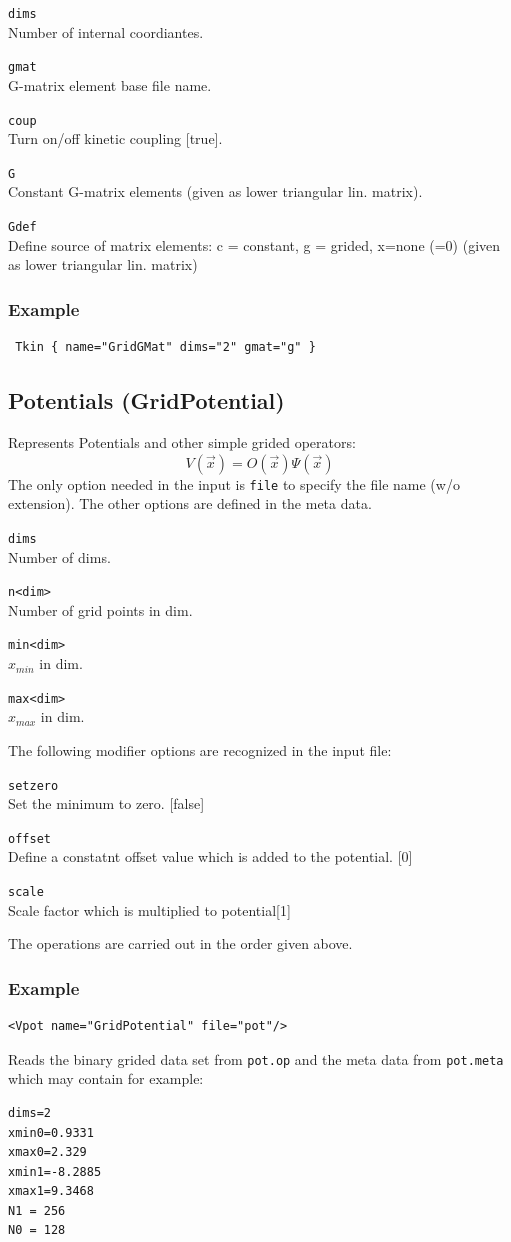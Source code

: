 \documentclass[a4paper,12pt]{scrbook}
\newcommand{\option}[2]{\item \texttt{#1}\\ #2}
\begin{document}
\begin{options}
\option{dims}{Number of internal coordiantes.}
\option{gmat}{G-matrix element base file name.}
\option{coup}{Turn on/off kinetic coupling [true].}
\option{G}{Constant G-matrix elements (given as lower triangular lin. matrix).}
\option{Gdef}{Define source of matrix elements: c = constant, g = grided, x=none (=0) (given as lower triangular lin. matrix)}
\end{options}

\subsubsection*{Example}
\begin{verbatim}
 Tkin { name="GridGMat" dims="2" gmat="g" }
\end{verbatim}

\subsection{Potentials (GridPotential)}
Represents Potentials and other simple grided operators:
\begin{equation}
 V(\vec{x}) = \hat O(\vec{x}) \Psi(\vec{x})
\end{equation}
The only option needed in the input is \verb|file| to specify the file name (w/o extension).
The other options are defined in the meta data.
\begin{options}
 \option{dims}{Number of dims.}
 \option{n<dim>}{Number of grid points in dim.}
 \option{min<dim>}{$x_{min}$ in dim.}
 \option{max<dim>}{$x_{max}$ in dim.}
\end{options}

The following modifier options are recognized in the input file:
\begin{options}
 \option{setzero}{Set the minimum to zero. [false]}
 \option{offset}{Define a constatnt offset value which is added to the potential. [0]}
 \option{scale}{Scale factor which is multiplied to potential[1]}
\end{options}
The operations are carried out in the order given above.

\subsubsection*{Example}
\begin{verbatim}
<Vpot name="GridPotential" file="pot"/>
\end{verbatim}
Reads the binary grided data set from \verb|pot.op| and the meta data from \verb|pot.meta| which may contain for example:
\begin{verbatim}
dims=2
xmin0=0.9331
xmax0=2.329
xmin1=-8.2885
xmax1=9.3468
N1 = 256
N0 = 128
\end{verbatim}
\end{document}
